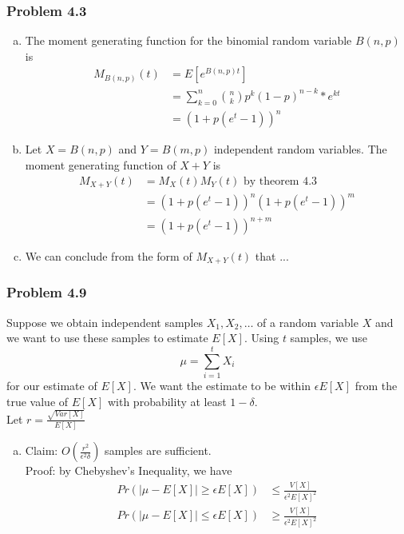 \documentclass[12pt,letterpaper]{article}
\newenvironment{answer}[1]{
  \subsubsection*{Problem #1}
}{\newpage}
\begin{document}
\begin{answer}{4.3}
\begin{enumerate}[(a)]
	\item The moment generating function for the binomial random variable $B(n,p)$ is
		\begin{align*}
		M_{B(n,p)}(t) &= E[e^{B(n,p)t}] \\
			&= \sum_{k=0}^n {n \choose k} p^k(1-p)^{n-k} * e^{kt}\\
			&= (1 + p(e^t - 1))^n
		\end{align*}
	\item Let $X = B(n,p)$ and $Y = B(m, p)$ independent random variables. The moment generating function of $X + Y$ is
		\begin{align*}
		M_{X + Y}(t) &= M_X(t)M_Y(t) \text{ by theorem 4.3} \\
			&= (1 + p(e^t - 1))^n (1 + p(e^t - 1))^m \\
			&= (1 + p(e^t - 1))^{n + m}
		\end{align*}
	\item We can conclude from the form of $M_{X+Y}(t)$ that ...
\end{enumerate}
\end{answer}





\begin{answer}{4.9}
	Suppose we obtain independent samples $X_1, X_2, \ldots$ of a random variable $X$ and we want to use these samples to estimate $E[X]$. Using $t$ samples, we use
		$$ \mu = \sum_{i=1}^t X_i$$
	for our estimate of $E[X]$. We want the estimate to be within $\epsilon E[X]$ from the true value of $E[X]$ with probability at least $1 - \delta$. \\
	Let $r = \frac{\sqrt{Var[X]}}{E[X]}$
\begin{enumerate}[(a)]
	\item Claim: $O\left( \frac{ r^2 }{ \epsilon^2 \delta }\right)$ samples are sufficient. \\Proof: by Chebyshev's Inequality, we have
		\begin{align*}
			Pr\left( |\mu - E[X]| \ge \epsilon E[X]\right) &\le \frac{V[X]}{\epsilon^2 E[X]^2}\\
			Pr\left( |\mu - E[X]| \le \epsilon E[X]\right) &\ge \frac{V[X]}{\epsilon^2 E[X]^2}
		\end{align*}
\end{enumerate}
\end{answer}
\end{document}
